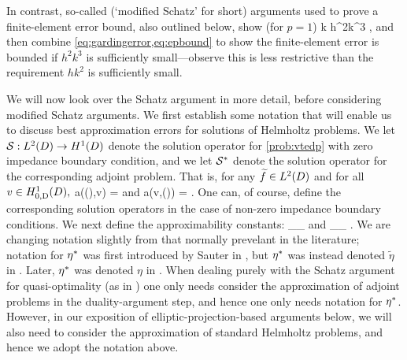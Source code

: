 In contrast, so-called  (`modified Schatz' for short) arguments used to prove a finite-element error bound, also outlined below, show (for $p=1$)
\beq\label{eq:epbound}
k \lesssim h^2k^3 ,
\eeq
and then combine \cref{eq:gardingerror,eq:epbound} to show the finite-element error is bounded if $h^2k^3$ is sufficiently small---observe this is less restrictive than the requirement $hk^2$ is sufficiently small.

We will now look over the Schatz argument in more detail, before considering modified Schatz arguments. We first establish some notation that will enable us to discuss best approximation errors for solutions of Helmholtz problems. We let $\solfem:\LtD\rightarrow \HoD$ denote the solution operator for \cref{prob:vtedp} with zero impedance boundary condition, and we let $\mathcal S^{*}$ denote the solution operator for the corresponding adjoint problem. That is, for any $\ftilde \in \LtD$ and for all $v \in \HozDD,$
\beqs
a(\solfem(\ftilde),v) = 
\eeqs
and
\beqs
a(v,\solfems(\ftilde)) = .
\eeqs
One can, of course, define the corresponding solution operators in the case of non-zero impedance boundary conditions. We next define the approximability constants:
\beqs
\wba \de \sup_{\ftilde \in \LtD}\inf_{\vh \in \Vhp} \frac{\NW{\solfem(\ftilde) - \vh}}{\NLtD{\ftilde}}
\eeqs
and
\beqs
\wbaadj \de \sup_{\ftilde \in \LtD}\inf_{\vh \in \Vhp} \frac{\NW{\solfems(\ftilde) - \vh}}{\NLtD{\ftilde}}.
\eeqs
We are changing notation slightly from that normally prevelant in the literature; notation for $\eta^{*}$ was first introduced by Sauter in \cite[Section 2.2]{Sa:06}, but $\eta^{*}$ was instead denoted $\tilde{\eta}$ in \cite{Sa:06}. Later, $\eta^{*}$ was denoted $\eta$ in \cite[Equation (4.5)]{MeSa:10}.  When dealing purely with the Schatz argument for quasi-optimality (as in \cite[Section 2.2]{Sa:06}) one only needs consider the approximation of adjoint problems in the duality-argument step, and hence one only needs notation for $\eta^{*}$. However, in our exposition of elliptic-projection-based arguments below, we will also need to consider the approximation of standard Helmholtz problems, and hence we adopt the notation above.

